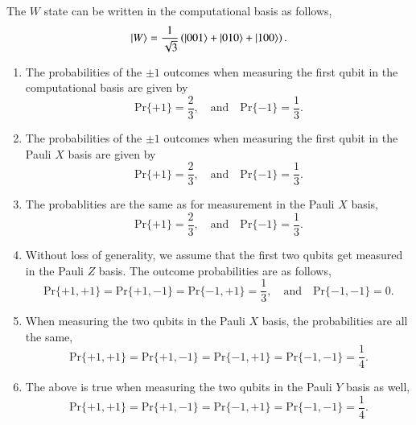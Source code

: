 \begin{solution}
The $W$ state can be written in the computational basis as follows,
\begin{equation*}
    \left| W \right\rangle = \frac{1}{\sqrt{3}} \left( \left| 001 \right\rangle + \left| 010 \right\rangle + \left| 100 \right\rangle \right).
\end{equation*}
\begin{enumerate}[label=(\alph*)]
    \item The probabilities of the $\pm1$ outcomes when measuring the first qubit in the computational basis are given by
    \begin{equation*}
        \text{Pr}\{+1\} = \frac{2}{3}, \quad\text{and}\quad \text{Pr}\{-1\} = \frac{1}{3}.
    \end{equation*}
    \item The probabilities of the $\pm1$ outcomes when measuring the first qubit in the Pauli $X$ basis are given by
    \begin{equation*}
        \text{Pr}\{+1\} = \frac{2}{3}, \quad\text{and}\quad \text{Pr}\{-1\} = \frac{1}{3}.
    \end{equation*}
    \item The probablities are the same as for measurement in the Pauli $X$ basis,
    \begin{equation*}
        \text{Pr}\{+1\} = \frac{2}{3}, \quad\text{and}\quad \text{Pr}\{-1\} = \frac{1}{3}.
    \end{equation*}
    \item Without loss of generality, we assume that the first two qubits get measured in the Pauli $Z$ basis. The outcome probabilities are as follows,
    \begin{equation*}
        \text{Pr}\{+1,+1\} = \text{Pr}\{+1,-1\} = \text{Pr}\{-1,+1\} = \frac{1}{3}, \quad \text{and} \quad \text{Pr}\{-1,-1\} = 0.
    \end{equation*}
    \item When measuring the two qubits in the Pauli $X$ basis, the probabilities are all the same,
    \begin{equation*}
        \text{Pr}\{+1,+1\} = \text{Pr}\{+1,-1\} = \text{Pr}\{-1,+1\} = \text{Pr}\{-1,-1\} = \frac{1}{4}.
    \end{equation*}
    \item The above is true when measuring the two qubits in the Pauli $Y$ basis as well,
    \begin{equation*}
        \text{Pr}\{+1,+1\} = \text{Pr}\{+1,-1\} = \text{Pr}\{-1,+1\} = \text{Pr}\{-1,-1\} = \frac{1}{4}.
    \end{equation*}
\end{enumerate}
\end{solution}

